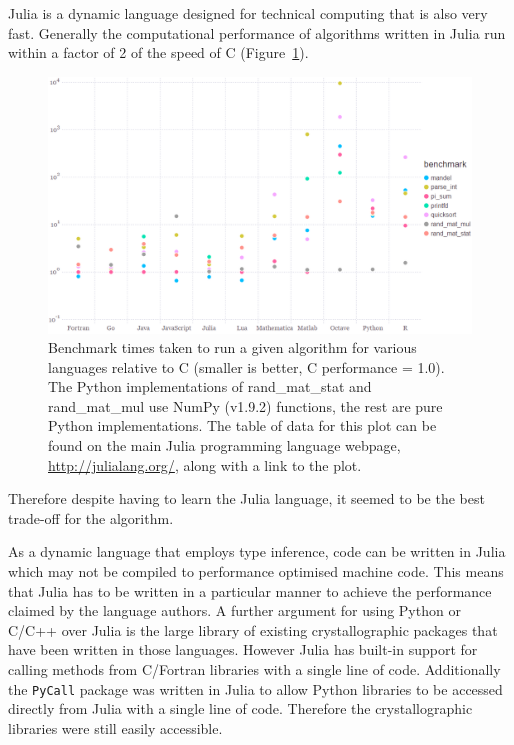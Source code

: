 Julia is a dynamic language designed for technical computing \cite{bezanson2014julia,bezanson2012julia} that is also very fast.
Generally the computational performance of algorithms written in Julia run within a factor of 2 of the speed of C (Figure~\ref{fig:Language performance benchmarks}).
\begin{figure}[ht!]
    \centering
    \includegraphics[width=1.0\textwidth]{figures/datared/language_benchmarks.png}
    \caption{Benchmark times taken to run a given algorithm for various languages relative to C (smaller is better, C performance = 1.0).
    The Python implementations of rand\_mat\_stat and rand\_mat\_mul use NumPy (v1.9.2) functions, the rest are pure Python implementations.
    The table of data for this plot can be found on the main Julia programming language webpage, \url{http://julialang.org/}, along with a link to the plot.}
    \label{fig:Language performance benchmarks}
\end{figure}
Therefore despite having to learn the Julia language, it seemed to be the best trade-off for the algorithm.

As a dynamic language that employs type inference, code can be written in Julia which may not be compiled to performance optimised machine code.
This means that Julia has to be written in a particular manner to achieve the performance claimed by the language authors.
A further argument for using Python or C/C++ over Julia is the large library of existing crystallographic packages that have been written in those languages.
However Julia has built-in support for calling methods from C/Fortran libraries with a single line of code.
Additionally the \verb+PyCall+ package was written in Julia to allow Python libraries to be accessed directly from Julia with a single line of code.
Therefore the crystallographic libraries were still easily accessible.

